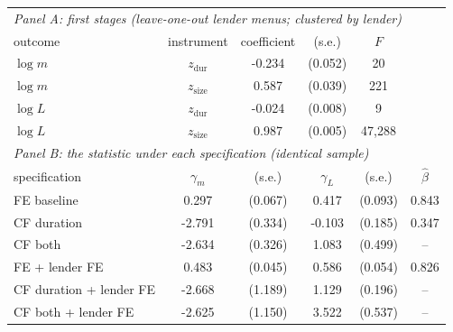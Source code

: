 \begin{tabular}{lccccc}
\toprule
\multicolumn{6}{l}{\emph{Panel A: first stages (leave-one-out lender menus; clustered by lender)}} \\
outcome & instrument & coefficient & (s.e.) & $F$ & \\
\midrule
$\log m$ & $z_{\mathrm{dur}}$ & -0.234 & (0.052) & 20 & \\
$\log m$ & $z_{\mathrm{size}}$ & 0.587 & (0.039) & 221 & \\
$\log L$ & $z_{\mathrm{dur}}$ & -0.024 & (0.008) & 9 & \\
$\log L$ & $z_{\mathrm{size}}$ & 0.987 & (0.005) & 47,288 & \\
\midrule
\multicolumn{6}{l}{\emph{Panel B: the statistic under each specification (identical sample)}} \\
specification & $\gamma_m$ & (s.e.) & $\gamma_L$ & (s.e.) & $\widehat\beta$ \\
\midrule
FE baseline & 0.297 & (0.067) & 0.417 & (0.093) & 0.843 \\
CF duration & -2.791 & (0.334) & -0.103 & (0.185) & 0.347 \\
CF both & -2.634 & (0.326) & 1.083 & (0.499) & -- \\
FE + lender FE & 0.483 & (0.045) & 0.586 & (0.054) & 0.826 \\
CF duration + lender FE & -2.668 & (1.189) & 1.129 & (0.196) & -- \\
CF both + lender FE & -2.625 & (1.150) & 3.522 & (0.537) & -- \\
\bottomrule
\end{tabular}